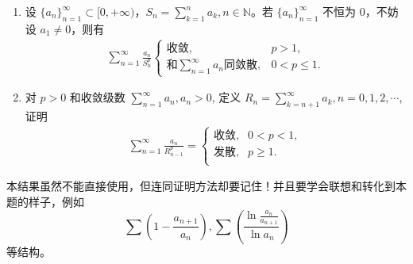 \documentclass[../../main.tex]{subfiles}
\begin{document}
\begin{proposition}\label{proposition:部分和相关级数重要性质}
\begin{enumerate}
\item 设 \( \{a_n\}_{n = 1}^{\infty} \subset [0, +\infty) \)，\( S_n = \sum_{k = 1}^{n} a_k, n \in \mathbb{N} \)。若 \( \{a_n\}_{n = 1}^{\infty} \) 不恒为 0，不妨设 \( a_1 \neq 0 \)，则有
\begin{align*}
\sum_{n = 1}^{\infty} \frac{a_n}{S_n^p}
\begin{cases} 
\text{收敛}, & p > 1, \\
\text{和} \sum_{n = 1}^{\infty} a_n \text{同敛散}, & 0 < p \leqslant 1 .
\end{cases}
\end{align*}

\item 对 \( p > 0 \) 和收敛级数 \( \sum_{n=1}^{\infty} a_n, a_n > 0 \), 定义 \( R_n = \sum_{k=n+1}^{\infty} a_k, n = 0,1,2,\cdots \),证明
\begin{align*}
\sum_{n=1}^{\infty}{\frac{a_n}{R_{n-1}^{p}}}=\begin{cases}
\text{收敛},&0<p<1,\\
\text{发散},&p\geqslant 1.\\
\end{cases}
\end{align*}
\end{enumerate}
\end{proposition}
\begin{note}
本结果虽然不能直接使用，但连同证明方法却要记住！并且要学会联想和转化到本题的样子，例如
\[
\sum \left( 1 - \frac{a_{n + 1}}{a_n} \right), \sum \left( \frac{\ln \frac{a_n}{a_{n + 1}}}{\ln a_n} \right)
\]
等结构。
\end{note}
\end{document}
